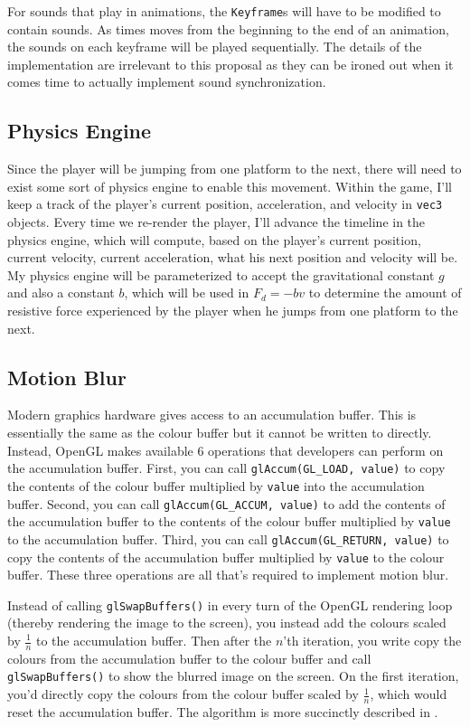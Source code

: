 \documentclass[11pt]{article}
\begin{document}
For sounds that play in animations, the \verb|Keyframe|s will have to be modified to contain sounds. As times moves from the beginning to the end of an animation, the sounds on each keyframe will be played sequentially. The details of the implementation are irrelevant to this proposal as they can be ironed out when it comes time to actually implement sound synchronization.

\subsection{Physics Engine}
Since the player will be jumping from one platform to the next, there will need to exist some sort of physics engine to enable this movement. Within the game, I'll keep a track of the player's current position, acceleration, and velocity in \verb|vec3| objects. Every time we re-render the player, I'll advance the timeline in the physics engine, which will compute, based on the player's current position, current velocity, current acceleration, what his next position and velocity will be. My physics engine will be parameterized to accept the gravitational constant $g$ and also a constant $b$, which will be used in $F_d = -bv$ to determine the amount of resistive force experienced by the player when he jumps from one platform to the next.

\subsection{Motion Blur}
Modern graphics hardware gives access to an accumulation buffer. This is essentially the same as the colour buffer but it cannot be written to directly. Instead, OpenGL makes available 6 operations that developers can perform on the accumulation buffer. First, you can call \verb|glAccum(GL_LOAD, value)| to copy the contents of the colour buffer multiplied by \verb|value| into the accumulation buffer. Second, you can call \verb|glAccum(GL_ACCUM, value)| to add the contents of the accumulation buffer to the contents of the colour buffer multiplied by \verb|value| to the accumulation buffer. Third, you can call \verb|glAccum(GL_RETURN, value)| to copy the contents of the accumulation buffer multiplied by \verb|value| to the colour buffer. These three operations are all that's required to implement motion blur.

Instead of calling \verb|glSwapBuffers()| in every turn of the OpenGL rendering loop (thereby rendering the image to the screen), you instead add the colours scaled by $\frac{1}{n}$ to the accumulation buffer. Then after the $n$'th iteration, you write copy the colours from the accumulation buffer to the colour buffer and call \verb|glSwapBuffers()| to show the blurred image on the screen. On the first iteration, you'd directly copy the colours from the colour buffer scaled by $\frac{1}{n}$, which would reset the accumulation buffer. The algorithm is more succinctly described in \cite{wikibooks-motion-blur}.
\end{document}

